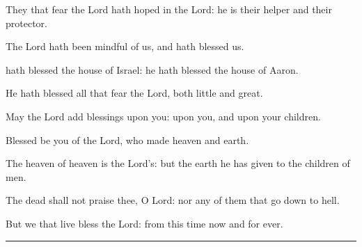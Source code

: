 \documentclass[letterpaper,12pt]{article} %
\begin{document}
\begin{parcolumns}[colwidths={1=262pt},rulebetween]{2}
{\begin{psalmverses}[0]
\item They that fear the Lord hath hoped in the Lord: he is their helper and their protector.
\item The Lord hath been mindful of us, and hath blessed us.
\item hath blessed the house of Israel: he hath blessed the house of Aaron.
\item He hath blessed all that fear the Lord, both little and great.
\item May the Lord add blessings upon you: upon you, and upon your children.
\item Blessed be you of the Lord, who made heaven and earth.
\item The heaven of heaven is the Lord's: but the earth he has given to the children of men.
\item The dead shall not praise thee, O Lord: nor any of them that go down to hell.
\item But we that live bless the Lord: from this time now and for ever.
\end{psalmverses}}
\end{parcolumns}
\bigskip
{}
\vspace*{-20pt}
\pagebreak
\begin{center}\vspace*{-5ex}{\large\textbf Chapter.}\end{center}
\begin{parcolumns}[rulebetween,colwidths={1=268pt}]{2}
\end{parcolumns}
\medskip
\hrule
\medskip
\end{document}
